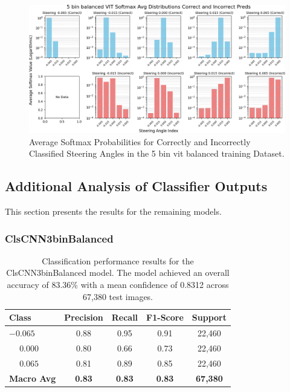 \begin{figure}[H]
    \centering
    \includegraphics[width=1\linewidth]{Figures/Results/5_bins_vit_softmax_dist_plot_balanced.png}
    \caption{Average Softmax Probabilities for Correctly and Incorrectly Classified Steering Angles in the 5 bin vit balanced training Dataset.}
    \label{fig:5_bins_vit_softmax_dist_balanced}
\end{figure}

\subsection{Additional Analysis of Classifier Outputs}

This section presents the results for the remaining models.


\subsubsection{ClsCNN3binBalanced}

\begin{table}[htbp]
\centering
\begin{tabular}{@{}lcccc@{}}
\toprule
\textbf{Class} & \textbf{Precision} & \textbf{Recall} & \textbf{F1-Score} & \textbf{Support} \\
\midrule
$-0.065$ & 0.88 & 0.95 & 0.91 & 22,460 \\
$\phantom{-}0.000$ & 0.80 & 0.66 & 0.73 & 22,460 \\
$\phantom{-}0.065$ & 0.81 & 0.89 & 0.85 & 22,460 \\
\midrule
\textbf{Macro Avg} & \textbf{0.83} & \textbf{0.83} & \textbf{0.83} & \textbf{67,380} \\
\bottomrule
\end{tabular}
\caption{Classification performance results for the ClsCNN3binBalanced model. The model achieved an overall accuracy of 83.36\% with a mean confidence of 0.8312 across 67,380 test images.}
\label{tab:clf_report_ClsCNN3binBalanced}
\end{table}

